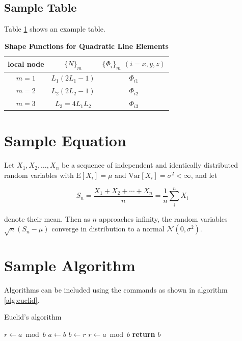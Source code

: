 \documentclass[9pt,twocolumn,twoside]{styles/osajnl}
\begin{document}
\subsection{Sample Table}

Table \ref{tab:shape-functions} shows an example table.

\begin{table}[htbp]
\centering
\caption{\bf Shape Functions for Quadratic Line Elements}
\begin{tabular}{ccc}
\hline
local node & $\{N\}_m$ & $\{\Phi_i\}_m$ $(i=x,y,z)$ \\
\hline
$m = 1$ & $L_1(2L_1-1)$ & $\Phi_{i1}$ \\
$m = 2$ & $L_2(2L_2-1)$ & $\Phi_{i2}$ \\
$m = 3$ & $L_3=4L_1L_2$ & $\Phi_{i3}$ \\
\hline
\end{tabular}
  \label{tab:shape-functions}
\end{table}

\section{Sample Equation}

Let $X_1, X_2, \ldots, X_n$ be a sequence of independent and
identically distributed random variables with $\text{E}[X_i] = \mu$
and $\text{Var}[X_i] = \sigma^2 < \infty$, and let

\begin{equation}
S_n = \frac{X_1 + X_2 + \cdots + X_n}{n}
      = \frac{1}{n}\sum_{i}^{n} X_i
\label{eq:refname1}
\end{equation}

denote their mean. Then as $n$ approaches infinity, the random
variables $\sqrt{n}(S_n - \mu)$ converge in distribution to a normal
$\mathcal{N}(0, \sigma^2)$. 

\section{Sample Algorithm}

Algorithms can be included using the commands as shown in algorithm
\ref{alg:euclid}.

\begin{algorithm}
\caption{Euclid’s algorithm}\label{alg:euclid}
\begin{algorithmic}[1]
\State $r\gets a\bmod b$
\State $a\gets b$
\State $b\gets r$
\State $r\gets a\bmod b$
\EndWhile\label{euclidendwhile}
\State \textbf{return} $b$
\EndProcedure
\end{algorithmic}
\end{algorithm}
\end{document}
